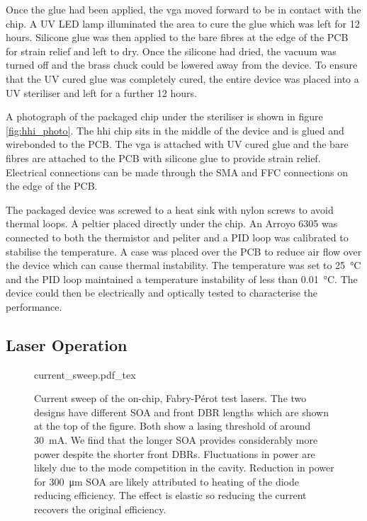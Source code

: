 Once the glue had been applied, the \ac{vga} moved forward to be in contact with the chip. A UV LED lamp illuminated the area to cure the glue which was left for 12 hours. Silicone glue was then applied to the bare fibres at the edge of the PCB for strain relief and left to dry. Once the silicone had dried, the vacuum was turned off and the brass chuck could be lowered away from the device. To ensure that the UV cured glue was completely cured, the entire device was placed into a UV steriliser and left for a further 12 hours. 

A photograph of the packaged chip under the steriliser is shown in figure \ref{fig:hhi_photo}. The \ac{hhi} chip sits in the middle of the device and is glued and wirebonded to the PCB. The \ac{vga} is attached with UV cured glue and the bare fibres are attached to the PCB with silicone glue to provide strain relief. Electrical connections can be made through the SMA and FFC connections on the edge of the PCB.

The packaged device was screwed to a heat sink with nylon screws to avoid thermal loops. A peltier placed directly under the chip. An Arroyo 6305 was connected to both the thermistor and peliter and a PID loop was calibrated to stabilise the temperature. A case was placed over the PCB to reduce air flow over the device which can cause thermal instability. The temperature was set to \SI{25}{\celsius} and the PID loop maintained a temperature instability of less than \SI{0.01}{\celsius}. The device could then be electrically and optically tested to characterise the performance.

\subsection{Laser Operation}

\begin{figure}[t]
	\centering
	\small	
	\def\svgwidth{\textwidth} 
	{current_sweep.pdf_tex}
	\caption[Current sweep of the HHI Fabry-P\'{e}rot test lasers]{Current sweep of the on-chip, Fabry-P\'{e}rot test lasers. The two designs have different \acs{SOA} and front \acs{DBR} lengths which are shown at the top of the figure. Both show a lasing threshold of around \SI{30}{\mA}. We find that the longer \acs{SOA} provides considerably more power despite the shorter front \acsp{DBR}. Fluctuations in power are likely due to the mode competition in the cavity. Reduction in power for \SI{300}{\um} \acs{SOA} are likely attributed to heating of the diode reducing efficiency. The effect is elastic so reducing the current recovers the original efficiency.}
	\label{fig:hhi_soa_sweep}
\end{figure}

